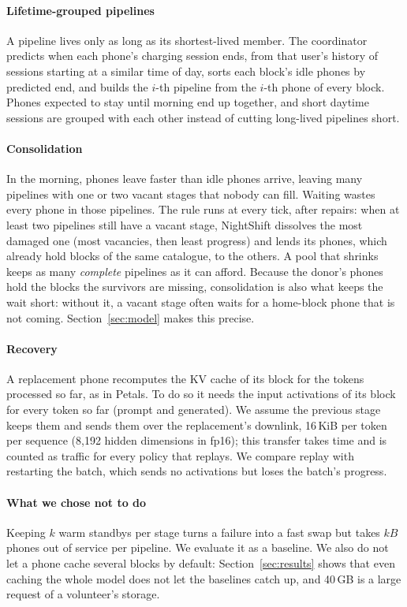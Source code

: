 \documentclass[preprint,review,12pt,authoryear]{elsarticle}
\begin{document}
\paragraph{Lifetime-grouped pipelines} A pipeline lives only as long as its
shortest-lived member. The coordinator predicts when each phone's charging
session ends, from that user's history of sessions starting at a similar time
of day, sorts each block's idle phones by predicted end, and builds the $i$-th
pipeline from the $i$-th phone of every block. Phones expected to stay until
morning end up together, and short daytime sessions are grouped with each
other instead of cutting long-lived pipelines short.

\paragraph{Consolidation} In the morning, phones leave faster than idle phones
arrive, leaving many pipelines with one or two vacant stages that nobody can
fill. Waiting wastes every phone in those pipelines. The rule runs at every
tick, after repairs: when at least two pipelines still have a vacant stage,
NightShift dissolves the most damaged one (most vacancies, then least
progress) and lends its phones, which already hold blocks of the same
catalogue, to the others. A pool that shrinks keeps as many \emph{complete}
pipelines as it can afford. Because the donor's phones hold the blocks the
survivors are missing, consolidation is also what keeps the wait short:
without it, a vacant stage often waits for a home-block phone that is not
coming. Section~\ref{sec:model} makes this precise.

\paragraph{Recovery} A replacement phone recomputes the KV cache of its block
for the tokens processed so far, as in Petals. To do so it needs the input
activations of its block for every token so far (prompt and generated). We
assume the previous stage keeps them and sends them over the replacement's
downlink, 16\,KiB per token per sequence (8,192 hidden dimensions in fp16);
this transfer takes time and is counted as traffic for every policy that
replays. We compare replay with restarting the batch, which sends no
activations but loses the batch's progress.

\paragraph{What we chose not to do} Keeping $k$ warm standbys per stage turns a
failure into a fast swap but takes $k B$ phones out of service per pipeline.
We evaluate it as a baseline. We also do not let a phone cache several
blocks by default: Section~\ref{sec:results} shows that even caching the whole
model does not let the baselines catch up, and 40\,GB is a large request of a
volunteer's storage.
\end{document}
